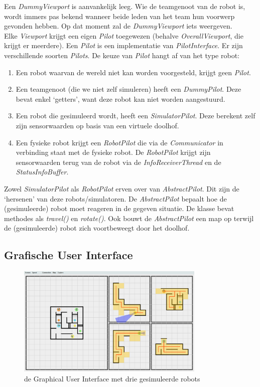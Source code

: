 \documentclass[tt3]{penoverslag}
\begin{document}
Een \textit{DummyViewport} is aanvankelijk leeg. Wie de teamgenoot van de robot is, wordt immers pas bekend wanneer beide leden van het team hun voorwerp gevonden hebben. Op dat moment zal de \textit{DummyViewport} iets weergeven.\\

Elke \textit{Viewport} krijgt een eigen \textit{Pilot} toegewezen (behalve \textit{OverallViewport}, die krijgt er meerdere). Een \textit{Pilot} is een implementatie van \textit{PilotInterface}. Er zijn verschillende soorten \textit{Pilots}. De keuze van \textit{Pilot} hangt af van het type robot:

\begin{enumerate}
	\item Een robot waarvan de wereld niet kan worden voorgesteld, krijgt geen \textit{Pilot}.
	\item Een teamgenoot (die we niet zelf simuleren) heeft een \textit{DummyPilot}. Deze bevat enkel `getters', want deze robot kan niet worden aangestuurd.
	\item Een robot die gesimuleerd wordt, heeft een \textit{SimulatorPilot}. Deze berekent zelf zijn sensorwaarden op basis van een virtuele doolhof.
	\item Een fysieke robot krijgt een \textit{RobotPilot} die via de \textit{Communicator} in verbinding staat met de fysieke robot. De \textit{RobotPilot} krijgt zijn sensorwaarden terug van de robot via de \textit{InfoReceiverThread} en de \textit{StatusInfoBuffer}.
\end{enumerate}

 Zowel \textit{SimulatorPilot} als \textit{RobotPilot} erven over van \textit{AbstractPilot}. Dit zijn de `hersenen' van deze robots/simulatoren. De \textit{AbstractPilot} bepaalt hoe de (gesimuleerde) robot moet reageren in de gegeven situatie. De klasse bevat methodes als \textit{travel()} en \textit{rotate()}. Ook bouwt de \textit{AbstractPilot} een map op terwijl de (gesimuleerde) robot zich voortbeweegt door het doolhof.

\subsection{Grafische User Interface}
\label{ssec:GUI}

\begin{figure}[h]
\centering
	\includegraphics[width=0.8\textwidth]{GUI1}
\caption{de Graphical User Interface met drie gesimuleerde robots}
\label{fig:GUI1}
\end{figure}
\end{document}
